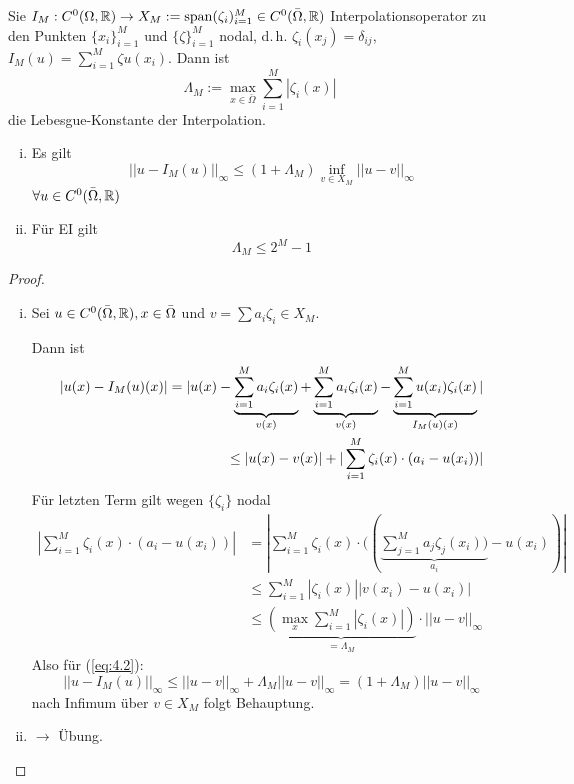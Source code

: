 \begin{satz}
Sie  $I_M:C^0(\Omega,\mathbb{R}) \rightarrow X_M := \operatorname{span} (\zeta_i)_{i=1}^M \in C^0(\bar{\Omega},\mathbb{R})$ Interpolationsoperator zu den Punkten $\{x_i\}_{i=1}^M$ und $\{\zeta\}_{i=1}^M$ nodal, d.\,h. $\zeta_i(x_j) = \delta_{ij}$, $I_M (u) = \sum\limits_{i=1}^M \zeta u(x_i)$. Dann ist
\[
	\Lambda_M := \max\limits_{x \in \bar{\Omega}} \sum\limits_{i=1}^M |\zeta_i (x)|
\]
die Lebesgue-Konstante der Interpolation.
\begin{enumerate}[i)]
	\item Es gilt
	\[
		|| u - I_M(u)||_{\infty} \leq (1 + \Lambda_M) \inf\limits_{v \in X_M} ||u-v||_{\infty}
	\]
	$\forall u \in C^0(\bar{\Omega},\mathbb{R})$
	\item Für EI gilt
	\[
		\Lambda_M \leq 2^M -1
	\]
\end{enumerate}
\begin{proof}
\begin{enumerate}[i)]
	\item Sei $u \in C^0 (\bar{\Omega},\mathbb{R}), x \in \bar{\Omega}$ und $v = \sum a_i \zeta_i \in X_M$.
	
	Dann ist
\begin{align}	
	|u(x) - I_M(u)(x)| = |u(x) - \underbrace{\sum\limits_{i=1}^M a_i \zeta_i(x)}_{v(x)} + \underbrace{\sum\limits_{i=1}^M a_i \zeta_i(x)}_{v(x)} - \underbrace{\sum\limits_{i=1}^M u(x_i) \zeta_i(x)}_{I_M(u)(x)}| \notag \\ \leq |u(x) - v(x)| + |\sum\limits_{i=1}^M \zeta_i(x) \cdot (a_i - u(x_i))| \label{eq:4.2}
	\end{align}
	Für letzten Term gilt wegen $\{\zeta_i\}$ nodal
	\begin{align*}
	|\sum\limits_{i=1}^M \zeta_i(x) \cdot (a_i - u(x_i))| &= |\sum\limits_{i=1}^M \zeta_i(x) \cdot ((\underbrace{\sum\limits_{j=1}^M a_j \zeta_j(x_i))}_{a_i} - u(x_i))| \\
	&\leq \sum\limits_{i=1}^M |\zeta_i(x)| |v(x_i) - u(x_i)| \\
	&\leq \underbrace{(\max\limits_x \sum\limits_{i=1}^M |\zeta_i(x)|)}_{= \Lambda_M} \cdot ||u-v||_{\infty}
	\end{align*}
	Also für (\ref{eq:4.2}):
	\[
		||u-I_M(u)||_{\infty} \leq ||u-v||_{\infty} + \Lambda_M ||u-v||_{\infty} = (1 + \Lambda_M) ||u-v||_{\infty}
	\]
	nach Infimum über $v \in X_M$ folgt Behauptung.
	\item $\rightarrow$ Übung.
\end{enumerate}
\end{proof}
\end{satz}

